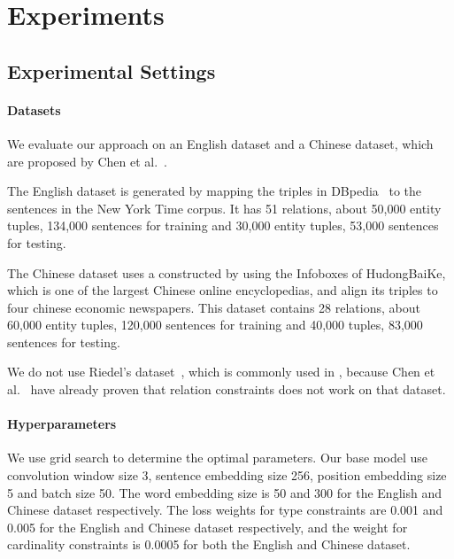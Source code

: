 \section{Experiments}

\subsection{Experimental Settings}
\paragraph{Datasets}
We evaluate our approach on an English dataset and a Chinese dataset, which are proposed by Chen et al.~.


The English dataset is generated by mapping the triples in DBpedia~\cite{bizer2009dbpedia} to the sentences in the New York Time corpus. It has 51 relations, about 50,000 entity tuples, 134,000 sentences for training and 30,000 entity tuples, 53,000 sentences for testing.

The Chinese dataset uses a \KB constructed by using the Infoboxes of HudongBaiKe, which is one of the largest Chinese online encyclopedias, and align its triples to  four chinese economic newspapers.
This dataset contains 28 relations, about 60,000 entity tuples, 120,000 sentences for training and 40,000 tuples, 83,000 sentences for testing.

We do not use Riedel's dataset~\cite{riedel2010modeling}, which is commonly used in \RE, because  Chen et al.~ have already proven that relation constraints does not work on that dataset.


\paragraph{Hyperparameters}
We use grid search to determine the optimal parameters.
Our base model use convolution window size 3, sentence embedding size 256, position embedding size 5 and batch size 50.
The word embedding size is 50 and 300 for the English and Chinese dataset respectively.
The loss weights for type constraints are 0.001 and 0.005 for the English and Chinese dataset respectively, 
and the weight for cardinality constraints is 0.0005 for both the English and Chinese dataset.

